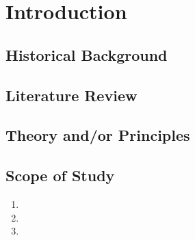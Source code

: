 \chapter{Introduction}
\setlength{\parskip}{12pt}
\setlength{\parindent}{10mm} 
\onehalfspacing
\lipsum[1-3] %

\section{Historical Background}
\lipsum[1-3] %

\section{Literature Review}
\lipsum[1-3] %

\section{Theory and/or Principles}
\lipsum[1-3] %

\section{Scope of Study}
\begin{enumerate}
\item \lipsum[2-2] %
\item \lipsum[2-2] %
\item \lipsum[2-2] %
\end{enumerate}



